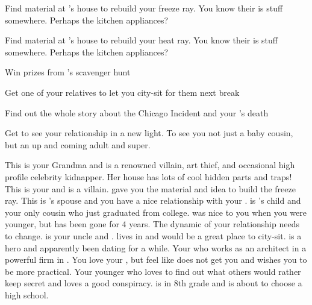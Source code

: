 \documentclass[char]{LRSguildcamp1}
\begin{document}
 
\begin{itemz}[Goals]
	\item Find material at \cGrandma{}'s house to rebuild your freeze ray. You know their is stuff somewhere. Perhaps the kitchen appliances? 
		\item Find material at \cGrandma{}'s house to rebuild your heat ray. You know their is stuff somewhere. Perhaps the kitchen appliances? 
		\item Win prizes from \cGrandma{}'s scavenger hunt
		\item Get one of your relatives to let you city-sit for them next break
		\item Find out the whole story about the Chicago Incident and your \cAS{\parent}'s death
		\item Get \cGrad{} to see your relationship in a new light. To see you not just a baby cousin, but an up and coming adult and super.
\end{itemz}

\begin{itemz}[Notes]
	\item 
\end{itemz}
\begin{contacts}
	\contact{\cGrandma{}} This is your Grandma and is a renowned villain, art thief, and occasional high profile celebrity kidnapper. Her house has lots of cool hidden parts and traps!
	\contact{\cOldest{}} This is your  \cOldest{\uncle} and is a villain.  gave you the material and idea to build the freeze ray.
	\contact{\cOS{}} This is \cOldest{}'s spouse and you have a nice relationship with your \cOS{\uncle}.
	\contact{\cGrad{}} \cGrad{} is \cOldest{}'s child and your only cousin who just graduated from college. \cGrad{} was nice to you when you were younger, but has been gone for 4 years. The dynamic of your relationship needs to change. 
	\contact{\cYoungest{}} \cYoungest{} is your uncle and \cYoungest{\hero}. \cYoungest{} lives in \pCityYoungest{} and would be a great place to city-sit.  
	\contact{\cYS{}} \cYS{} is a hero and apparently been dating \cYoungest{} for a while. 
	\contact{\cArchitect{}} Your \cArchitect{\parent} who works as an architect in a powerful firm in \pCityArchitect{}.  You love your \cArchitect{\parent}, but feel like \cArchitect{\they} does not get you and wishes you to be more practical. 
	 	\contact{\cTween{}} Your younger \cTween{\sibling} who loves to find out what others would rather keep secret and loves a good conspiracy. \cTween{} is in 8th grade and is about to choose a high school.
\end{contacts}
\end{document}
